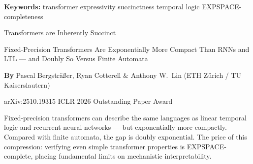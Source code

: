 \documentclass[10pt,twocolumn]{article}
\begin{document}
\setlength{\parindent}{0pt}
\setlength{\parskip}{4pt}

{\small\color{keywordgray}\textbf{Keywords:}
  transformer expressivity \textbullet{}
  succinctness \textbullet{}
  temporal logic \textbullet{}
  EXPSPACE-completeness}\par\vspace{4pt}

{\LARGE\bfseries\raggedright
  Transformers are Inherently Succinct}\par\vspace{4pt}

{\large\itshape\raggedright
  Fixed-Precision Transformers Are Exponentially More Compact
  Than RNNs and LTL --- and Doubly So Versus Finite Automata}\par\vspace{6pt}

{\small\textbf{By} Pascal Bergstr\"{a}\ss{}er, Ryan Cotterell \&
  Anthony W.\ Lin (ETH Z\"{u}rich / TU Kaiserslautern)}\par\vspace{2pt}

{\small\color{keywordgray}arXiv:2510.19315 \textbullet{}
  ICLR 2026 Outstanding Paper Award}
\par\vspace{2pt}\noindent{\color{rulered}\rule{\columnwidth}{0.6pt}}\vspace{6pt}

Fixed-precision transformers can describe the same languages as linear
temporal logic and recurrent neural networks --- but exponentially more
compactly. Compared with finite automata, the gap is doubly exponential.
The price of this compression: verifying even simple transformer properties
is EXPSPACE-complete, placing fundamental limits on mechanistic
interpretability.
\end{document}
